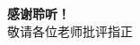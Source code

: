 \documentclass[aspectratio=169, 10pt]{beamer}
\begin{document}
\begin{frame}{}
\begin{center}
\vspace{1cm}
\Large \textbf{感谢聆听！} \\
\vspace{0.5cm}
\large 敬请各位老师批评指正 \\
\vspace{1cm}
\end{center}
\end{frame}
\end{document}
